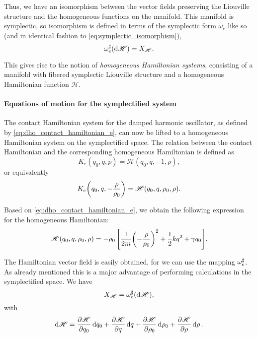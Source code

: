 Thus, we have an isomorphism between the vector fields preserving the Liouville structure and the homogeneous functions on the manifold. 
This manifold is symplectic, so isomorphism is defined in terms of the symplectic form \(\omega_e\) like so (and in identical fashion to \cref{eq:symplectic_isomorphism}),
\begin{equation}
     \omega_e^\sharp(\dd{\mathscr{H}}) = X_\mathscr{H}.
\end{equation}

This gives rise to the notion of \emph{homogeneous Hamiltonian systems}, consisting of a manifold with fibered symplectic Liouville structure and a homogeneous Hamiltonian function \(\mathscr{H}\).

\paragraph{Equations of motion for the symplectified system} The contact Hamiltonian system for the damped harmonic oscillator, as defined by \cref{eq:dho_contact_hamiltonian_e}, can now be lifted to a homogeneous Hamiltonian system on the symplectified space. The relation between the contact Hamiltonian and the corresponding homogeneous Hamiltonian is defined as \cite{VanderSchaft2021a,Libermann1987,Arnold1989}
\begin{equation}
     K_e(q_0, q, p) = \mathscr{H}(q_0, q, -1, \rho),
\end{equation}
or equivalently
\begin{equation}
    K_e\qty(q_0, q, -\frac{\rho}{\rho_0}) = \mathscr{H}(q_0, q, \rho_0, \rho). 
    \label{eq:H_contact_homo}
\end{equation}

Based on \cref{eq:dho_contact_hamiltonian_e}, we obtain the following expression for the homogeneous Hamiltonian:
\begin{equation}
    \mathscr{H}(q_0, q, \rho_0, \rho) = -\rho_0\,\qty[\frac{1}{2m}\qty(-\frac{\rho}{\rho_0})^2 + \frac{1}{2}kq^2 + \gamma q_0]. 
    \label{eq:H_dho_homo}
\end{equation}

The Hamiltonian vector field is easily obtained, for we can use the mapping \(\omega_e^\sharp\). As already mentioned this is a major advantage of performing calculations in the symplectified space. We have
\begin{equation}
     X_\mathscr{H} = \omega_e^\sharp(\dd{\mathscr{H}}),
\end{equation} 
with
\begin{equation}
     \dd{\mathscr{H}} = \pdv{\mathscr{H}}{q_0}\dd{q_0} 
                      + \pdv{\mathscr{H}}{q}\dd{q}
                      + \pdv{\mathscr{H}}{\rho_0}\dd{\rho_0}
                      + \pdv{\mathscr{H}}{\rho}\dd{\rho}.
\end{equation}

